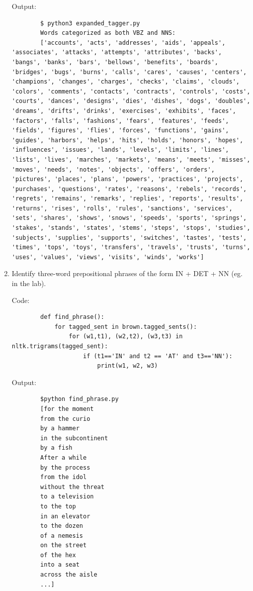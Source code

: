 \documentclass[12pt]{article}
\begin{document}
\begin{enumerate}
		Output:
		\begin{lstlisting}
		$ python3 expanded_tagger.py
		Words categorized as both VBZ and NNS:
		['accounts', 'acts', 'addresses', 'aids', 'appeals', 'associates', 'attacks', 'attempts', 'attributes', 'backs', 'bangs', 'banks', 'bars', 'bellows', 'benefits', 'boards', 'bridges', 'bugs', 'burns', 'calls', 'cares', 'causes', 'centers', 'champions', 'changes', 'charges', 'checks', 'claims', 'clouds', 'colors', 'comments', 'contacts', 'contracts', 'controls', 'costs', 'courts', 'dances', 'designs', 'dies', 'dishes', 'dogs', 'doubles', 'dreams', 'drifts', 'drinks', 'exercises', 'exhibits', 'faces', 'factors', 'falls', 'fashions', 'fears', 'features', 'feeds', 'fields', 'figures', 'flies', 'forces', 'functions', 'gains', 'guides', 'harbors', 'helps', 'hits', 'holds', 'honors', 'hopes', 'influences', 'issues', 'lands', 'levels', 'limits', 'lines', 'lists', 'lives', 'marches', 'markets', 'means', 'meets', 'misses', 'moves', 'needs', 'notes', 'objects', 'offers', 'orders', 'pictures', 'places', 'plans', 'powers', 'practices', 'projects', 'purchases', 'questions', 'rates', 'reasons', 'rebels', 'records', 'regrets', 'remains', 'remarks', 'replies', 'reports', 'results', 'returns', 'rises', 'rolls', 'rules', 'sanctions', 'services', 'sets', 'shares', 'shows', 'snows', 'speeds', 'sports', 'springs', 'stakes', 'stands', 'states', 'stems', 'steps', 'stops', 'studies', 'subjects', 'supplies', 'supports', 'switches', 'tastes', 'tests', 'times', 'tops', 'toys', 'transfers', 'travels', 'trusts', 'turns', 'uses', 'values', 'views', 'visits', 'winds', 'works']
		\end{lstlisting}
		
		\item Identify three-word prepositional phrases of the form IN + DET + NN (eg. in the lab).
		
		Code:
		\begin{lstlisting}
		def find_phrase():
			for tagged_sent in brown.tagged_sents():
				for (w1,t1), (w2,t2), (w3,t3) in nltk.trigrams(tagged_sent):
					if (t1=='IN' and t2 == 'AT' and t3=='NN'):
						print(w1, w2, w3)
		\end{lstlisting}
		
		Output:
		\begin{lstlisting}
		$python find_phrase.py
		[for the moment
		from the curio
		by a hammer
		in the subcontinent
		by a fish
		After a while
		by the process
		from the idol
		without the threat
		to a television
		to the top
		in an elevator
		to the dozen
		of a nemesis
		on the street
		of the hex
		into a seat
		across the aisle
		...]
		\end{lstlisting}
		

\end{enumerate}
\end{document}
